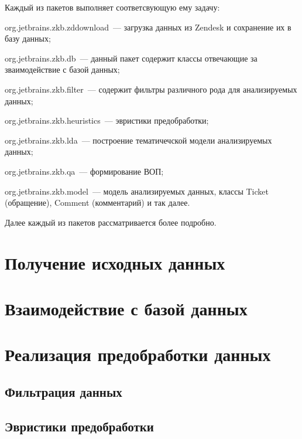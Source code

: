 Каждый из пакетов выполняет соответсвующую ему задачу:

\begin{itemize*}
\item org.jetbrains.zkb.zddownload~--- загрузка данных из Zendesk и сохранение их в базу данных;
\item org.jetbrains.zkb.db~--- данный пакет содержит классы отвечающие за зваимодействие с базой данных;
\item org.jetbrains.zkb.filter~--- содержит фильтры различного рода для анализируемых данных;
\item org.jetbrains.zkb.heuristics~--- эвристики предобработки;
\item org.jetbrains.zkb.lda~--- построение тематичечской модели анализируемых данных;
\item org.jetbrains.zkb.qa~--- формирование ВОП;
\item org.jetbrains.zkb.model~--- модель анализируемых данных, классы Ticket (обращение), Comment (комментарий) и так далее.
\end{itemize*}

Далее каждый из пакетов рассматривается более подробно.
\section{Получение исходных данных}

\section{Взаимодействие с базой данных}

\section{Реализация предобработки данных}
\subsection{Фильтрация данных}
\subsection{Эвристики предобработки}
